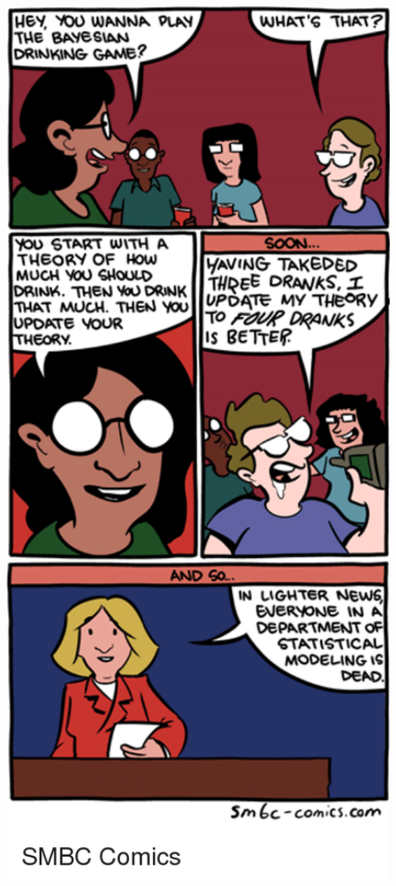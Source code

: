 \documentclass[
]{book}
\begin{document}
\includegraphics[width=6.94in]{images/Joke}
\end{document}
